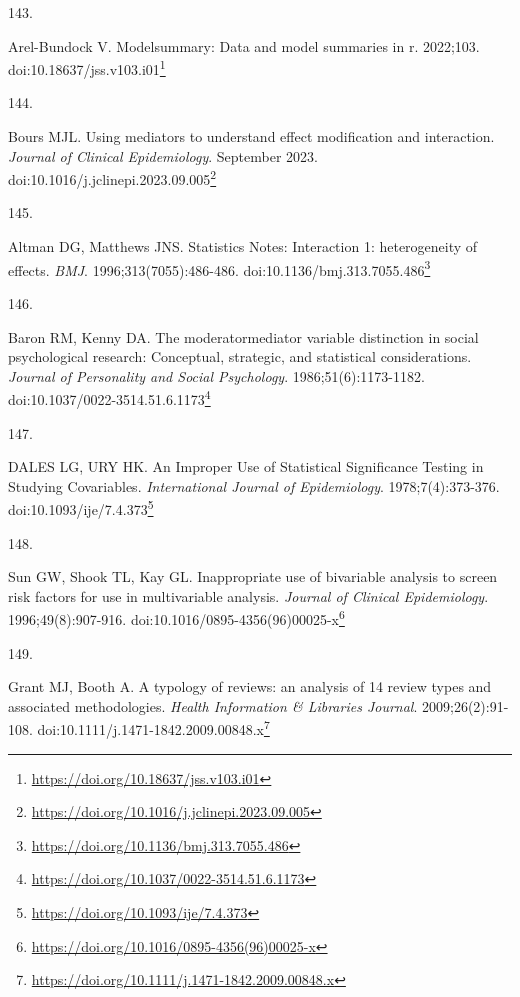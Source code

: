 \documentclass[
  a4paper,
]{book}
\newlength{\cslhangindent}
\newlength{\csllabelwidth}
\newlength{\cslentryspacingunit} %
\newenvironment{CSLReferences}[2] %
 {%
  \setlength{\parindent}{0pt}
  \ifodd #1
  \let\oldpar\par
  \def\par{\hangindent=\cslhangindent\oldpar}
  \fi
  \setlength{\parskip}{#2\cslentryspacingunit}
 }%
 {}
\newcommand{\CSLLeftMargin}[1]{\parbox[t]{\csllabelwidth}{#1}}
\newcommand{\CSLRightInline}[1]{\parbox[t]{\linewidth - \csllabelwidth}{#1}\break}
\renewcommand{\href}[2]{#2\footnote{\url{#1}}}
\begin{document}
\begin{CSLReferences}{0}{0}
\leavevmode{}%
\CSLLeftMargin{143. }%
\CSLRightInline{Arel-Bundock V. {\textbraceleft}Modelsummary{\textbraceright}: Data and model summaries in {\textbraceleft}r{\textbraceright}. 2022;103. doi:\href{https://doi.org/10.18637/jss.v103.i01}{10.18637/jss.v103.i01}}

\leavevmode{}%
\CSLLeftMargin{144. }%
\CSLRightInline{Bours MJL. Using mediators to understand effect modification and interaction. \emph{Journal of Clinical Epidemiology}. September 2023. doi:\href{https://doi.org/10.1016/j.jclinepi.2023.09.005}{10.1016/j.jclinepi.2023.09.005}}

\leavevmode{}%
\CSLLeftMargin{145. }%
\CSLRightInline{Altman DG, Matthews JNS. Statistics Notes: Interaction 1: heterogeneity of effects. \emph{BMJ}. 1996;313(7055):486-486. doi:\href{https://doi.org/10.1136/bmj.313.7055.486}{10.1136/bmj.313.7055.486}}

\leavevmode{}%
\CSLLeftMargin{146. }%
\CSLRightInline{Baron RM, Kenny DA. The moderator{\textendash}mediator variable distinction in social psychological research: Conceptual, strategic, and statistical considerations. \emph{Journal of Personality and Social Psychology}. 1986;51(6):1173-1182. doi:\href{https://doi.org/10.1037/0022-3514.51.6.1173}{10.1037/0022-3514.51.6.1173}}

\leavevmode{}%
\CSLLeftMargin{147. }%
\CSLRightInline{DALES LG, URY HK. An Improper Use of Statistical Significance Testing in Studying Covariables. \emph{International Journal of Epidemiology}. 1978;7(4):373-376. doi:\href{https://doi.org/10.1093/ije/7.4.373}{10.1093/ije/7.4.373}}

\leavevmode{}%
\CSLLeftMargin{148. }%
\CSLRightInline{Sun GW, Shook TL, Kay GL. Inappropriate use of bivariable analysis to screen risk factors for use in multivariable analysis. \emph{Journal of Clinical Epidemiology}. 1996;49(8):907-916. doi:\href{https://doi.org/10.1016/0895-4356(96)00025-x}{10.1016/0895-4356(96)00025-x}}

\leavevmode{}%
\CSLLeftMargin{149. }%
\CSLRightInline{Grant MJ, Booth A. A typology of reviews: an analysis of 14 review types and associated methodologies. \emph{Health Information \& Libraries Journal}. 2009;26(2):91-108. doi:\href{https://doi.org/10.1111/j.1471-1842.2009.00848.x}{10.1111/j.1471-1842.2009.00848.x}}


\end{CSLReferences}
\end{document}
